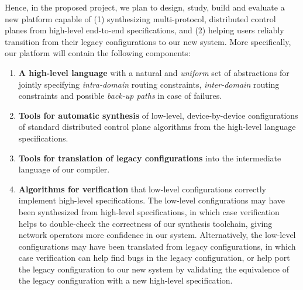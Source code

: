 Hence, in the proposed project, we plan to design, study, build and evaluate a new platform 
capable of (1) synthesizing multi-protocol, distributed control planes from high-level end-to-end specifications,
and (2) helping users reliably transition from their legacy configurations to our new system.  More specifically,
our platform will contain the following components:
\begin{enumerate}
\item {\bf A high-level language} with a natural and \emph{uniform} set of abstractions
for jointly specifying \emph{intra-domain} routing constraints, \emph{inter-domain}
routing constraints and possible \emph{back-up paths} in case of failures.
\item {\bf Tools for automatic synthesis} of low-level, device-by-device configurations of standard
distributed control plane algorithms from the high-level language specifications.
\item {\bf Tools for translation of legacy configurations} into the intermediate language of our compiler.
\item {\bf Algorithms for verification} that low-level configurations correctly implement high-level specifications.
The low-level configurations may have been synthesized from high-level specifications, in which case
verification helps to double-check the correctness of our synthesis toolchain, giving network operators more
confidence in our system.  Alternatively, the low-level configurations may have been
translated from legacy configurations, in which case verification can help find bugs in the legacy configuration,
or help port the legacy configuration to our new system by validating the equivalence of the legacy configuration with 
a new high-level specification.
\end{enumerate}

